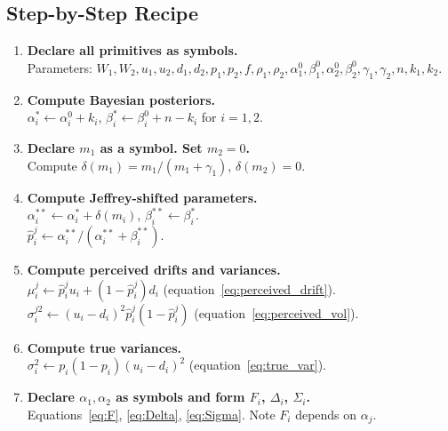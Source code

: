 \documentclass[12pt,a4paper]{article}
\newcommand{\1}{\mathbf{1}}
\begin{document}
\subsection{Step-by-Step Recipe}

\begin{enumerate}[label=\textbf{Step \arabic*.}, leftmargin=*, labelwidth=*, align=left]

  \item \textbf{Declare all primitives as symbols.}\\
  Parameters: $W_1, W_2, u_1, u_2, d_1, d_2, p_1, p_2, f, \rho_1, \rho_2, \alpha_1^0, \beta_1^0, \alpha_2^0, \beta_2^0, \gamma_1, \gamma_2, n, k_1, k_2$.

  \item \textbf{Compute Bayesian posteriors.}\\
  $\alpha_i^* \leftarrow \alpha_i^0 + k_i$, $\beta_i^* \leftarrow \beta_i^0 + n - k_i$ for $i=1,2$.

  \item \textbf{Declare $m_1$ as a symbol. Set $m_2 = 0$.}\\
  Compute $\delta(m_1) = m_1/(m_1+\gamma_1)$, $\delta(m_2) = 0$.

  \item \textbf{Compute Jeffrey-shifted parameters.}\\
  $\alpha_i^{**} \leftarrow \alpha_i^* + \delta(m_i)$, $\beta_i^{**} \leftarrow \beta_i^*$.\\
  $\hat{p}_i^j \leftarrow \alpha_i^{**}/(\alpha_i^{**}+\beta_i^{**})$.

  \item \textbf{Compute perceived drifts and variances.}\\
  $\mu_i^j \leftarrow \hat{p}_i^j u_i + (1-\hat{p}_i^j)d_i$ (equation~\eqref{eq:perceived_drift}).\\
  $\sigma_i^{j2} \leftarrow (u_i-d_i)^2\hat{p}_i^j(1-\hat{p}_i^j)$ (equation~\eqref{eq:perceived_vol}).

  \item \textbf{Compute true variances.}\\
  $\sigma_i^2 \leftarrow p_i(1-p_i)(u_i-d_i)^2$ (equation~\eqref{eq:true_var}).

  \item \textbf{Declare $\alpha_1, \alpha_2$ as symbols and form $F_i$, $\Delta_i$, $\Sigma_i$.}\\
  Equations~\eqref{eq:F}, \eqref{eq:Delta}, \eqref{eq:Sigma}. Note $F_i$ depends on $\alpha_j$.


\end{enumerate}
\end{document}
